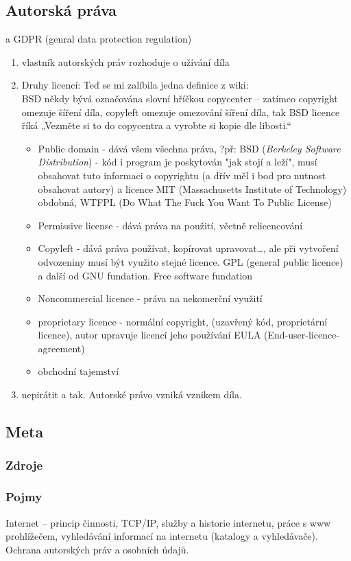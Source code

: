 \documentclass[12pt]{article}
\begin{document}
\subsection{Autorská práva}
a  GDPR (genral data protection regulation)
\begin{enumerate}
\item vlastník autorských práv rozhoduje o užívání díla
\item Druhy licencí:
Teď se mi zalíbila jedna definice z wiki:\\
BSD někdy bývá označována slovní hříčkou copycenter – zatímco copyright omezuje šíření díla, copyleft omezuje omezování šíření díla, tak BSD licence říká „Vezměte si to do copycentra a vyrobte si kopie dle libosti.“
\begin{itemize}
\item Public domain - dává všem všechna práva, ?př: BSD (\emph{Berkeley Software Distribution}) - kód i program  je poskytován "jak stojí a leží", musí obsahovat tuto informaci o copyrightu (a dřív měl i bod pro nutnost obsahovat autory) a licence MIT (Massachusetts Institute of Technology) obdobná, WTFPL (Do What The Fuck You Want To Public License)
\item Permissive license - dává práva na použití, včetně relicencování 
\item Copyleft - dává práva používat, kopírovat upravovat\dots, ale při vytvoření odvozeniny musí být využito stejné licence. GPL  (general public licence) a další od GNU fundation. Free software fundation
\item Noncommercial licence - práva na nekomerční využití
\item proprietary licence - normální copyright, (uzavřený kód, proprietární licence), autor upravuje licencí jeho používání EULA (End-user-licence-agreement)
\item obchodní tajemství
\end{itemize}
\item nepirátit a tak. Autorské právo vzniká vznikem díla.	
\end{enumerate}
\subsection{Meta}
\subsubsection{Zdroje}
\subsubsection{Pojmy}
Internet – princip činnosti, TCP/IP, služby a historie internetu, práce s www prohlížečem, vyhledávání informací na internetu (katalogy a vyhledávače). Ochrana autorských práv a osobních údajů. 
\end{document}
